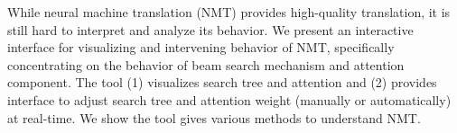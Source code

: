 While neural machine translation (NMT) provides high-quality translation, it is still hard to interpret and analyze its behavior. We present an interactive interface for visualizing and intervening behavior of NMT, specifically concentrating on the behavior of beam search mechanism and attention component. The tool (1) visualizes search tree and attention and (2) provides interface to adjust search tree and attention weight (manually or automatically) at real-time. We show the tool gives various methods to understand NMT.
